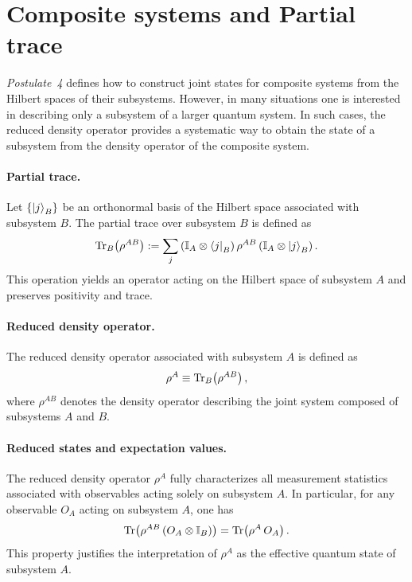 \section{Composite systems and Partial trace}
\label{sec:composite_systems}

\textit{Postulate~4} defines how to construct joint states for composite systems from the Hilbert spaces of their subsystems. However, in many situations one is interested in describing only a subsystem of a larger quantum system. In such cases, the reduced density operator provides a systematic way to obtain the state of a subsystem from the density operator of the composite system.

\paragraph{Partial trace.}
Let $\{ \ket{j}_B \}$ be an orthonormal basis of the Hilbert space associated with subsystem $B$. The partial trace over subsystem $B$ is defined as
\begin{equation}
    \Tr_{B}\!\left( \rho^{AB} \right) := \sum_j \left( \mathbb{I}_A \otimes \bra{j}_B \right) \rho^{AB} \left( \mathbb{I}_A \otimes \ket{j}_B \right).
\end{equation}
This operation yields an operator acting on the Hilbert space of subsystem $A$ and preserves positivity and trace.

\paragraph{Reduced density operator.}
The reduced density operator associated with subsystem $A$ is defined as
\begin{equation}
    \label{eq:partial_trace}
    \rho^{A} \equiv \Tr_{B}\!\left( \rho^{AB} \right),
\end{equation}
where $\rho^{AB}$ denotes the density operator describing the joint system composed of subsystems $A$ and $B$.

\paragraph{Reduced states and expectation values.}
The reduced density operator $\rho^{A}$ fully characterizes all measurement statistics associated with observables acting solely on subsystem $A$. In particular, for any observable $O_A$ acting on subsystem $A$, one has
\begin{equation}
    \Tr\!\left( \rho^{AB} \, (O_A \otimes \mathbb{I}_B) \right) = \Tr\!\left( \rho^{A} \, O_A \right).
\end{equation}
This property justifies the interpretation of $\rho^{A}$ as the effective quantum state of subsystem $A$.

